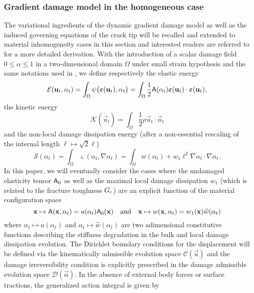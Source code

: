 \subsubsection{Gradient damage model in the homogeneous case}
The variational ingredients of the dynamic gradient damage model as well as the induced governing equations of the crack tip will be recalled and extended to material inhomogeneity cases in this section and interested readers are referred to \cite{LiMarigo:2015} for a more detailed derivation. With the introduction of a scalar damage field $0\leq\alpha\leq 1$ in a two-dimensional domain $\Omega$ under small strain hypothesis and the same notations used in \cite{LiMarigo:2015}, we define respectively the elastic energy
\begin{equation} \label{eq:elastic}
\mathcal{E}(\vec{u}_t,\alpha_t)=\int_\Omega\psi\bigl(\eps(\vec{u}_t),\alpha_t\bigr)=\int_\Omega\frac{1}{2}\tens{A}(\alpha_t)\eps(\vec{u}_t)\cdot\eps(\vec{u}_t),
\end{equation}
the kinetic energy
\begin{equation} \label{eq:kinetic}
\mathcal{K}(\dot{\vec{u}}_t)=\int_\Omega\frac{1}{2}\rho\dot{\vec{u}}_t\cdot\dot{\vec{u}}_t
\end{equation}
and the non-local damage dissipation energy (after a non-essential rescaling of the internal length $\ell\mapsto\sqrt{2}\ell$)
\begin{equation} \label{eq:surface}
\mathcal{S}(\alpha_t)=\int_\Omega\varsigma(\alpha_t,\nabla\alpha_t)=\int_\Omega w(\alpha_t)+w_1\ell^2\nabla\alpha_t\cdot\nabla\alpha_t.
\end{equation}
In this paper, we will eventually consider the cases where the undamaged elasticity tensor $\mathsf{A}_0$ as well as the maximal local damage dissipation $w_1$ (which is related to the fracture toughness $G_\mathrm{c}$) are an explicit function of the material configuration space
\[
\vec{x}\mapsto \tens{A}(\vec{x},\alpha_t)=a(\alpha_t)\tens{A_0}(\vec{x})\quad\text{and}\quad\vec{x}\mapsto w(\vec{x},\alpha_t)=w_1(\vec{x})\widehat{w}(\alpha_t)
\]
where $\alpha_t\mapsto a(\alpha_t)$ and $\alpha_t\mapsto \widehat{w}(\alpha_t)$ are two adimensional constitutive functions describing the stiffness degradation in the bulk and local damage dissipation evolution. The Dirichlet boundary conditions for the displacement will be defined via the kinematically admissible evolution space $\mathcal{C}(\vec{u})$ and the damage irreversibility condition is explicitly prescribed in the damage admissible evolution space $\mathcal{D}(\vec{\alpha})$. In the absence of external body forces or surface tractions, the generalized action integral is given by
